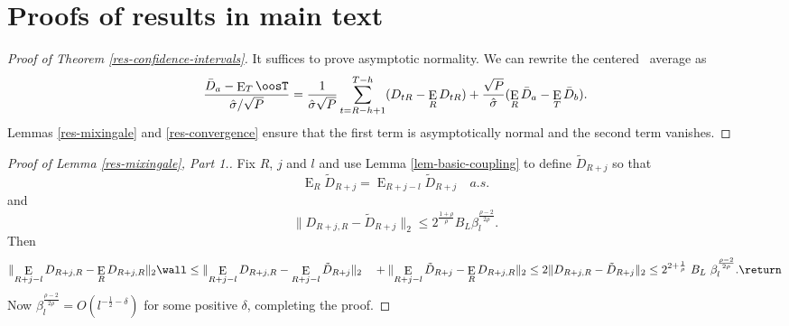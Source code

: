 \documentclass[11pt]{article}
\DeclareMathOperator{\E}{E}
\newcommand{\oosA}{\bar{D}_a}
\newcommand{\oosB}{\bar{D}_b}
\newcommand{\oosSum}[2]{\ensuremath{\sum_{#1=R-\h+#2}^{T-\h}}}
\newcommand{\h}{h}
\newcommand{\CenteredAverage}{\frac{\oosA - \E_T\oosT}{\hat\sigma / \sqrt{P}}}
\newcommand{\CenteredAverageI}{\ensuremath{\frac{1}{\hat\sigma
    \sqrt{P}}\oosSum{t}{1} (D_{tR} - \E_R D_{tR})}}
\newcommand{\CenteredAverageII}{\ensuremath{\frac{\sqrt{P}}{\hat\sigma}
    (\E_R\oosA - \E_T\oosB)}}
\newcommand{\couplingConstant}{\ensuremath{2^{\frac{1+\rho}{\rho}} B_L}}
\newcommand{\couplingBeta}[1]{\ensuremath{\beta^{\frac{\rho-2}{2\rho}}_{#1}}}
\newcommand{\couplingBound}[1]{\couplingConstant \couplingBeta{#1}}
\begin{document}
\section{Proofs of results in main text}
\begin{proof}[Proof of Theorem \ref{res-confidence-intervals}]
It suffices to prove asymptotic normality.  We can rewrite the
centered \oos\ average as
  \[
    \CenteredAverage = \CenteredAverageI + \CenteredAverageII.
  \]
Lemmas \ref{res-mixingale} and 
\ref{res-convergence} ensure that the first term is asymptotically
normal and the second term vanishes.
\end{proof}

\begin{proof}[Proof of Lemma \ref{res-mixingale}, Part 1.]
Fix $R$, $j$ and $l$ and use Lemma
\ref{lem-basic-coupling} to define $\tilde{D}_{R+j}$ so that
\[\E_R\tilde D_{R+j} = \E_{R+j-l} \tilde D_{R+j} \quad a.s. \]
and
\[\lVert D_{R+j,R} - \tilde D_{R+j} \rVert_2 \leq \couplingBound{l}.\]
Then
\[
\lVert \E_{R+j-l} D_{R+j,R} - \E_R D_{R+j,R} \rVert_2 \wall \leq 
\lVert \E_{R+j-l} D_{R+j,R} - \E_{R+j-l} \tilde{D}_{R+j} \rVert_2 \\
\quad + \lVert
\E_{R+j-l} \tilde{D}_{R+j} - \E_R D_{R+j,R} \rVert_2 \\
\leq 2 \lVert D_{R+j,R} - \tilde D_{R+j} \rVert_2 \\
\leq 2^{2 + \frac1\rho}\ B_L\ \couplingBeta{l}.\return
\]
Now $\couplingBeta{l} = O(l^{-\frac12 - \delta})$ for some
positive $\delta$, completing the proof.
\end{proof}
\end{document}
